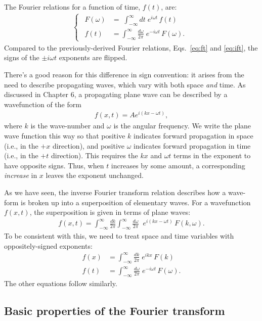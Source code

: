 \documentclass[10pt,a4paper]{article}
\begin{document}
The Fourier relations for a function of time, $f(t)$, are:
\begin{align}
  \left\{\;\,\begin{aligned}F(\omega) &= \;\int_{-\infty}^\infty dt\; e^{i\omega t}\, f(t) \\ f(t) &= \int_{-\infty}^\infty \frac{d\omega}{2\pi}\; e^{-i\omega t}\, F(\omega).\end{aligned}\;\,\right.
\end{align}
Compared to the previously-derived Fourier relations,
Eqs.~\eqref{eq:ft} and \eqref{eq:ift}, the signs of the $\pm i \omega
t$ exponents are flipped.

There's a good reason for this difference in sign convention: it
arises from the need to describe propagating waves, which vary with
both space \textit{and} time.  As discussed in Chapter 6, a
propagating plane wave can be described by a wavefunction of the form
\begin{align}
  f(x,t) = A e^{i(kx - \omega t)},
\end{align}
where $k$ is the wave-number and $\omega$ is the angular frequency.
We write the plane wave function this way so that positive $k$
indicates forward propagation in space (i.e., in the $+x$ direction),
and positive $\omega$ indicates forward propagation in time (i.e., in
the $+t$ direction).  This requires the $kx$ and $\omega t$ terms in
the exponent to have opposite signs. Thus, when $t$ increases by some
amount, a corresponding \textit{increase} in $x$ leaves the exponent
unchanged.

As we have seen, the inverse Fourier transform relation describes how
a wave-form is broken up into a superposition of elementary waves.
For a wavefunction $f(x,t)$, the superposition is given in terms of
plane waves:
\begin{align}
  f(x,t) = \int_{-\infty}^\infty \frac{dk}{2\pi} \int_{-\infty}^\infty \frac{d\omega}{2\pi}\;\; e^{i(kx-\omega t)}\, F(k,\omega).
\end{align}
To be consistent with this, we need to treat space and time variables
with oppositely-signed exponents:
\begin{align}
  f(x) &= \int_{-\infty}^\infty \frac{dk}{2\pi}\; e^{ikx}\, F(k) \\
  f(t) &= \int_{-\infty}^\infty \frac{d\omega}{2\pi}\; e^{-i\omega t}\, F(\omega).
\end{align}
The other equations follow similarly.

\subsection{Basic properties of the Fourier transform}
\label{fourier-basic-properties}
\end{document}
